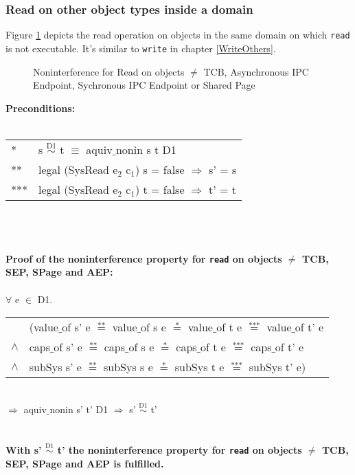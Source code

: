 \subsubsection{Read on other object types inside a domain} 
Figure \ref{fig:ReadOthers} depicts the read operation on objects in the same domain on which \texttt{read} is not executable. It's similar to \texttt{write} in chapter \ref{WriteOthers}.
\begin{flushleft}
\begin{figure}[H]
\caption{Noninterference for Read on objects $\neq$ TCB, Asynchronous IPC Endpoint, Sychronous IPC Endpoint or Shared Page}
\label{fig:ReadOthers}
\end{figure}
\end{flushleft}
\textbf{Preconditions:} \\ \\
\begin{tabular}{ll}
* & s $\overset{\text{D1}}{\sim}$ t $\equiv$ aquiv$\_$nonin s t D1	\\ 
** & legal (SysRead e$_2$ c$_1$) s = false $\Rightarrow$ s' = s \\ 
*** & legal (SysRead e$_2$ c$_1$) t = false $\Rightarrow$ t' = t
\end{tabular} \\ \\ \\
\textbf{Proof of the noninterference property for \texttt{read} on objects $\neq$ TCB, SEP, SPage and AEP:}\\ \\
$\forall$ e $\in$ D1. \\ 
\begin{tabular}{ll}
& (value$\_$of s' e $\overset{\text{**}}{=}$ value$\_$of s e $\overset{\text{*}}{=}$ value$\_$of t e $\overset{\text{***}}{=}$ value$\_$of t' e \\
$\wedge$ & caps$\_$of s' e $\overset{\text{**}}{=}$ caps$\_$of s e $\overset{\text{*}}{=}$ caps$\_$of t e $\overset{\text{***}}{=}$ caps$\_$of t' e \\
$\wedge$ & subSys s' e $\overset{\text{**}}{=}$ subSys s e $\overset{\text{*}}{=}$ subSys t e $\overset{\text{***}}{=}$ subSys t' e)
\end{tabular} \\
$\Rightarrow$ aquiv$\_$nonin s' t' D1 $\Rightarrow$ s' $\overset{\text{D1}}{\sim}$ t' \\ \\ \\
\textbf{With s' $\overset{\text{D1}}{\sim}$ t' the noninterference property for \texttt{read} on objects $\neq$ TCB, SEP, SPage and AEP is fulfilled.}  
\clearpage
